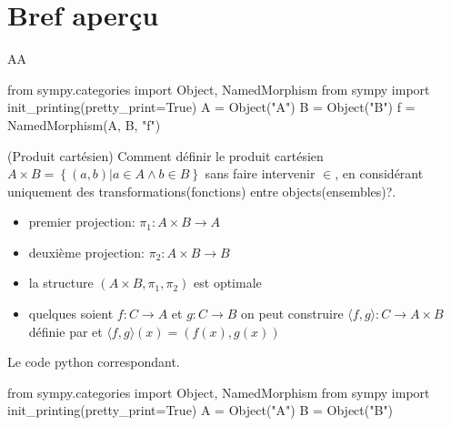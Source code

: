 \section{Bref aperçu}
\begin{definition}
AA
\end{definition}

\begin{python}
from sympy.categories import Object, NamedMorphism
from sympy import init_printing(pretty_print=True)
A = Object("A")
B = Object("B")
f = NamedMorphism(A, B, "f")
\end{python}

\begin{example}(Produit cartésien)
Comment définir le produit cartésien $A \times B = \left\lbrace \left( a, b\right)  \vert a \in A \wedge b \in B\right\rbrace$ sans faire intervenir $\in$, en considérant uniquement des transformations(fonctions) entre objects(ensembles)?.
\begin{itemize}
 \item premier projection: $\pi_{1}: A \times B \rightarrow A$
 \item deuxième projection: $\pi_{2}: A \times B \rightarrow B$
 \item la structure $\left(A \times B,\pi_{1},\pi_{2}\right) $ est optimale
 \item quelques soient $f: C \rightarrow A$ et $g: C \rightarrow B$ on peut construire 
 $\langle f, g \rangle: C \rightarrow A \times B$ définie par et $\langle f, g \rangle\left(x\right)=\left(f\left(x\right),g\left(x\right)\right)$
 \\
 
\end{itemize}
Le code python correspondant.
\begin{python}
from sympy.categories import Object, NamedMorphism
from sympy import init_printing(pretty_print=True)
A = Object("A")
B = Object("B")
\end{python}
\end{example}
